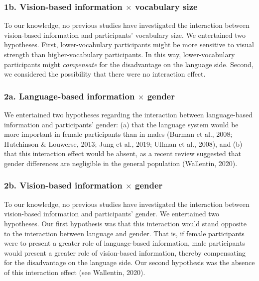 \documentclass[
  12pt,
  man,floatsintext]{apa7}
\begin{document}
\hypertarget{b.-vision-based-information-times-vocabulary-size}{%
\subsubsection{\texorpdfstring{1b. Vision-based information \(\times\) vocabulary size}{1b. Vision-based information \textbackslash times vocabulary size}}\label{b.-vision-based-information-times-vocabulary-size}}

To our knowledge, no previous studies have investigated the interaction between vision-based information and participants' vocabulary size. We entertained two hypotheses. First, lower-vocabulary participants might be more sensitive to visual strength than higher-vocabulary participants. In this way, lower-vocabulary participants might \emph{compensate} for the disadvantage on the language side. Second, we considered the possibility that there were no interaction effect.

\hypertarget{a.-language-based-information-times-gender}{%
\subsubsection{\texorpdfstring{2a. Language-based information \(\times\) gender}{2a. Language-based information \textbackslash times gender}}\label{a.-language-based-information-times-gender}}

We entertained two hypotheses regarding the interaction between language-based information and participants' gender: (a) that the language system would be more important in female participants than in males (Burman et al., 2008; Hutchinson \& Louwerse, 2013; Jung et al., 2019; Ullman et al., 2008), and (b) that this interaction effect would be absent, as a recent review suggested that gender differences are negligible in the general population (Wallentin, 2020).

\hypertarget{b.-vision-based-information-times-gender}{%
\subsubsection{\texorpdfstring{2b. Vision-based information \(\times\) gender}{2b. Vision-based information \textbackslash times gender}}\label{b.-vision-based-information-times-gender}}

To our knowledge, no previous studies have investigated the interaction between vision-based information and participants' gender. We entertained two hypotheses. Our first hypothesis was that this interaction would stand opposite to the interaction between language and gender. That is, if female participants were to present a greater role of language-based information, male participants would present a greater role of vision-based information, thereby compensating for the disadvantage on the language side. Our second hypothesis was the absence of this interaction effect (see Wallentin, 2020).
\end{document}
